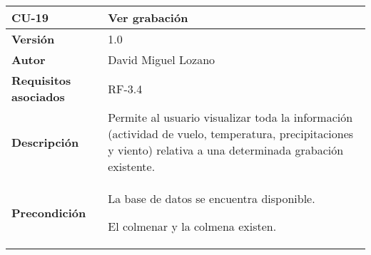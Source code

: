 \begin{longtable}[H]{@{}ll@{}}
\toprule
\begin{minipage}[b]{0.26\columnwidth}\raggedright\strut
\textbf{CU-19}\strut
\end{minipage} & \begin{minipage}[b]{0.68\columnwidth}\raggedright\strut
\textbf{Ver grabación}\strut
\end{minipage}\tabularnewline
\midrule
\endhead
\begin{minipage}[t]{0.26\columnwidth}\raggedright\strut
\textbf{Versión}\strut
\end{minipage} & \begin{minipage}[t]{0.68\columnwidth}\raggedright\strut
1.0\strut
\end{minipage}\tabularnewline
\begin{minipage}[t]{0.26\columnwidth}\raggedright\strut
\textbf{Autor}\strut
\end{minipage} & \begin{minipage}[t]{0.68\columnwidth}\raggedright\strut
David Miguel Lozano\strut
\end{minipage}\tabularnewline
\begin{minipage}[t]{0.26\columnwidth}\raggedright\strut
\textbf{Requisitos asociados}\strut
\end{minipage} & \begin{minipage}[t]{0.68\columnwidth}\raggedright\strut
RF-3.4\strut
\end{minipage}\tabularnewline
\begin{minipage}[t]{0.26\columnwidth}\raggedright\strut
\textbf{Descripción}\strut
\end{minipage} & \begin{minipage}[t]{0.68\columnwidth}\raggedright\strut
Permite al usuario visualizar toda la información (actividad de vuelo,
temperatura, precipitaciones y viento) relativa a una determinada
grabación existente.\strut
\end{minipage}\tabularnewline
\begin{minipage}[t]{0.26\columnwidth}\raggedright\strut
\textbf{Precondición}\strut
\end{minipage} & \begin{minipage}[t]{0.68\columnwidth}\raggedright\strut
La base de datos se encuentra disponible.

El colmenar y la colmena existen.


\end{minipage}
\end{longtable}
